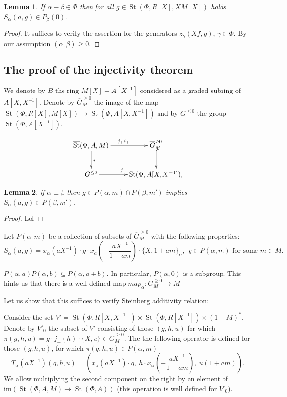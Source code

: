 \documentclass[oneside, 8pt]{amsart}
\newtheorem{lemma}{Lemma}
\theoremstyle{remark}
\theoremstyle{definition}
\DeclareMathOperator{\St}{St}
\numberwithin{equation}{section}
\begin{document}
\begin{lemma} If $\alpha - \beta \in \Phi$ then for all $g \in \St(\Phi, R[X], XM[X])$ holds $S_\alpha(a, g) \in P_\beta(0)$. \end{lemma}
\begin{proof}
It suffices to verify the assertion for the generators $z_\gamma(Xf, g)$, $\gamma \in \Phi$.
By our assumption $(\alpha, \beta) \geq 0$. 
\end{proof}

\subsection{The proof of the injectivity theorem}
We denote by $B$ the ring $M[X] + A[X^{-1}]$ considered as a graded subring of $A[X, X^{-1}]$.
Denote by $\overline{G}^{\geq 0}_M$ the image of the map $\St(\Phi, R[X], M[X]) \to \St(\Phi, A[X, X^{-1}])$ and by
 $G^{\leq 0}$ the group $\St(\Phi, A[X^{-1}])$.

\[ \xymatrix{ \overline{\St}(\Phi, A, M) \ar[r]^{j_+i_+} \ar[d]^{i^-} & \overline{G}_M^{\geq 0} \ar@{^{(}->}[d] \\
              G^{\leq 0} \ar[r]^{j_-} & \St(\Phi, A[X, X^{-1}]), } \] 

\begin{lemma} if $\alpha \perp \beta$ then $g \in P(\alpha, m) \cap P(\beta, m')$ implies $S_\alpha(a, g) \in P(\beta, m')$. \end{lemma}
\begin{proof}
 Lol
\end{proof}

Let $P(\alpha, m)$ be a collection of subsets of $\overline{G}^{\geq 0}_M$ with the following properties:
\[ S_\alpha(a, g) = x_\alpha(aX^{-1})\cdot g \cdot x_\alpha\left(-\frac{aX^{-1}}{1 + am}\right) \cdot \{X, 1+ am\}_\alpha,\ \ g \in P(\alpha, m)\text{ for some $m \in M$}.\]

$P(\alpha, a) P(\alpha, b) \subseteq P(\alpha, a + b)$.
In particular, $P(\alpha, 0)$ is a subgroup.
This hints us that there is a well-defined map $map_\alpha \colon G_M^{\geq 0} \to M$

Let us show that this suffices to verify Steinberg additivity relation:

Consider the set $V' = \St(\Phi, R[X, X^{-1}]) \times \St(\Phi, R[X^{-1}]) \times (1 + M)^*$.
Denote by $V'_0$ the subset of $V'$ consisting of those $(g, h, u)$ for which $\pi(g, h, u) = g \cdot j_-(h) \cdot \{ X, u \} \in \overline{G}_M^{\geq 0}$.
The the following operator is defined for those $(g, h, u)$, for which $\pi(g, h, u) \in P(\alpha, m)$
\[ T_\alpha(aX^{-1})(g, h, u) = \left( x_\alpha(aX^{-1})\cdot g ,\
                                         h \cdot x_\alpha\left(-\frac{aX^{-1}}{1 + am}\right),\ 
                                         u(1 + am)\right).\]
We allow multiplying the second component on the right by an element of $\mathrm{im}(\St(\Phi, A, M) \to \St(\Phi, A))$
 (this operation is well defined for $V'_0$).
\end{document}

